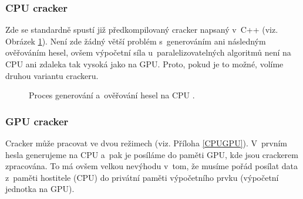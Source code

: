 \subsubsection{CPU cracker}
Zde se standardně spustí již předkompilovaný cracker napsaný v~C++ (viz. Obrázek \ref{CPU}). Není
zde žádný větší problém s~generováním ani následným ověřováním hesel, ovšem výpočetní síla
u~paralelizovatelných algoritmů není na CPU ani zdaleka tak vysoká jako na GPU. Proto, pokud je to
možné, volíme druhou variantu crackeru.
\begin{figure}[ht]
    \begin{center}
    \end{center}
    \caption{Proces generování a~ověřování hesel na CPU \cite{Schmied}.}
    \label{CPU}
\end{figure}

\subsubsection{GPU cracker}
Cracker může pracovat ve dvou režimech (viz. Příloha \ref{CPUGPU}). V~prvním hesla generujeme na
CPU a~pak je posíláme do paměti GPU, kde jsou crackerem zpracována. To má ovšem velkou nevýhodu
v~tom, že musíme pořád posílat data z~paměti hostitele (CPU) do privátní paměti výpočetního prvku
(výpočetní jednotka na GPU).

